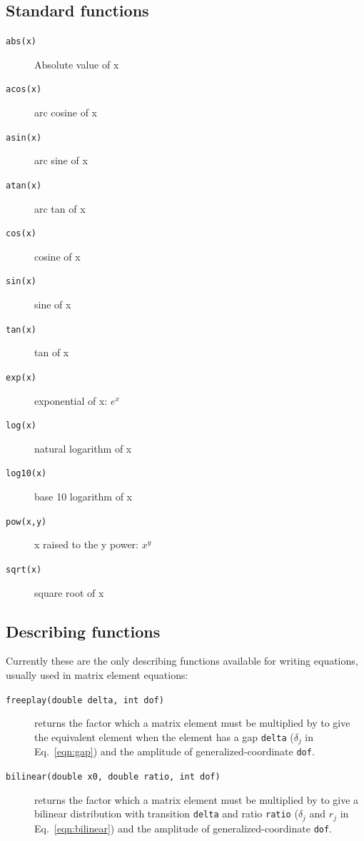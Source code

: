 \documentclass[10pt,openany,twoside]{book}
\numberwithin{equation}{section}   %
\newcommand{\Code}[1]{{\small\tt #1}}
\newcommand{\Eqn}[1]{Eq.\ \ref{#1}}
\begin{document}
\subsection{Standard functions}
\begin{description}
	\item[\Code{abs(x)}] Absolute value of x 
	\item[\Code{acos(x)}] arc cosine of x 
	\item[\Code{asin(x)}] arc sine of x 
	\item[\Code{atan(x)}] arc tan of x 
	\item[\Code{cos(x)}] cosine of x 
	\item[\Code{sin(x)}] sine of x 
	\item[\Code{tan(x)}] tan of x 
	\item[\Code{exp(x)}] exponential of x: $e^x$ 
	\item[\Code{log(x)}] natural logarithm of x 
	\item[\Code{log10(x)}] base 10 logarithm of x 
	\item[\Code{pow(x,y)}] x raised to the y power: $x^y$ 
	\item[\Code{sqrt(x)}] square root of x 
\end{description}

\subsection{Describing functions}\label{sect:eqn-df}
Currently these are the only describing functions available for
writing equations, usually used in matrix element equations:

\begin{description}
\item[\Code{freeplay(double delta, int dof)}]
   returns the factor which a matrix element must be multiplied
	by to give the equivalent element when the element has a gap
	\Code{delta} ($\delta_j$ in \Eqn{eqn:gap}) and the amplitude of
	generalized-coordinate \Code{dof}. 
\item[\Code{bilinear(double x0, double ratio, int dof)}]
returns the factor which a matrix element must be multiplied by to give
a bilinear distribution with transition \Code{delta} and ratio \Code{ratio}
($\delta_j$ and $r_j$ in \Eqn{eqn:bilinear}) and the amplitude of
generalized-coordinate \Code{dof}.
\end{description}
\end{document}
